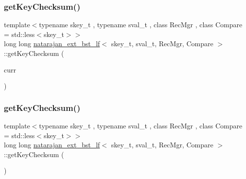 \mbox{\label{classnatarajan__ext__bst__lf_a33ed925f7c23b46bf67a688d78e1714a}} 
\subsubsection{\texorpdfstring{get\+Key\+Checksum()}{getKeyChecksum()}\hspace{0.1cm}{\footnotesize\ttfamily [2/4]}}
{\footnotesize\ttfamily template$<$typename skey\+\_\+t , typename sval\+\_\+t , class Rec\+Mgr , class Compare  = std\+::less$<$skey\+\_\+t$>$$>$ \\
long long \hyperlink{classnatarajan__ext__bst__lf}{natarajan\+\_\+ext\+\_\+bst\+\_\+lf}$<$ skey\+\_\+t, sval\+\_\+t, Rec\+Mgr, Compare $>$\+::get\+Key\+Checksum (\begin{DoxyParamCaption}\item[{\hyperlink{structnode__t}{node\+\_\+t}$<$ skey\+\_\+t, sval\+\_\+t $>$ $\ast$}]{curr }\end{DoxyParamCaption})\hspace{0.3cm}{\ttfamily [inline]}}

\mbox{\label{classnatarajan__ext__bst__lf_a6120769d8b8d6a14e673649d6ece6454}} 
\subsubsection{\texorpdfstring{get\+Key\+Checksum()}{getKeyChecksum()}\hspace{0.1cm}{\footnotesize\ttfamily [3/4]}}
{\footnotesize\ttfamily template$<$typename skey\+\_\+t , typename sval\+\_\+t , class Rec\+Mgr , class Compare  = std\+::less$<$skey\+\_\+t$>$$>$ \\
long long \hyperlink{classnatarajan__ext__bst__lf}{natarajan\+\_\+ext\+\_\+bst\+\_\+lf}$<$ skey\+\_\+t, sval\+\_\+t, Rec\+Mgr, Compare $>$\+::get\+Key\+Checksum (\begin{DoxyParamCaption}{ }\end{DoxyParamCaption})\hspace{0.3cm}{\ttfamily [inline]}}

